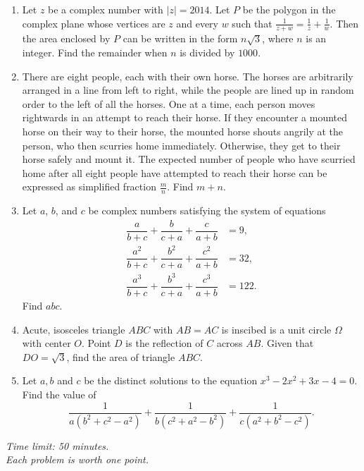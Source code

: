 \documentclass[11pt]{article}
\begin{document}
\begin{enumerate}
 \item Let $z$ be a complex number with $|z|=2014$. Let $P$ be the polygon in the complex plane whose vertices are $z$ and every $w$ such that $\frac{1}{z+w}=\frac{1}{z}+\frac{1}{w}$. Then the area enclosed by $P$ can be written in the form $n\sqrt{3}$, where $n$ is an integer. Find the remainder when $n$ is divided by $1000$.

 \item There are eight people, each with their own horse. The horses are arbitrarily arranged in a line from left to right, while the people are lined up in random order to the left of all the horses. One at a time, each person moves rightwards in an attempt to reach their horse. If they encounter a mounted horse on their way to their horse, the mounted horse shouts angrily at the person, who then scurries home immediately. Otherwise, they get to their horse safely and mount it. The expected number of people who have scurried home after all eight people have attempted to reach their horse can be expressed as simplified fraction $\tfrac{m}{n}$. Find $m+n$.

 \item Let $a$, $b$, and $c$ be complex numbers satisfying the system of equations\begin{align*}\dfrac{a}{b+c}+\dfrac{b}{c+a}+\dfrac{c}{a+b}&=9,\\\dfrac{a^2}{b+c}+\dfrac{b^2}{c+a}+\dfrac{c^2}{a+b}&=32,\\\dfrac{a^3}{b+c}+\dfrac{b^3}{c+a}+\dfrac{c^3}{a+b}&=122.\end{align*}Find $abc$.

 \item Acute, isosceles triangle $ABC$ with $AB = AC$ is inscibed is a unit circle $\Omega$ with center $O$. Point $D$ is the reflection of $C$ across $AB$. Given that $DO = \sqrt{3}$, find the area of triangle $ABC$.

 \item Let $a, b$ and $c$ be the distinct solutions to the equation $x^3-2x^2+3x-4=0$. Find the value of
$$\frac{1}{a(b^2+c^2-a^2)}+\frac{1}{b(c^2+a^2-b^2)}+\frac{1}{c(a^2+b^2-c^2)}.$$
\end{enumerate}

\vfill

\begin{flushright}
  \emph{Time limit: 50 minutes.} \\
  \emph{Each problem is worth one point.}
\end{flushright}
\end{document}
